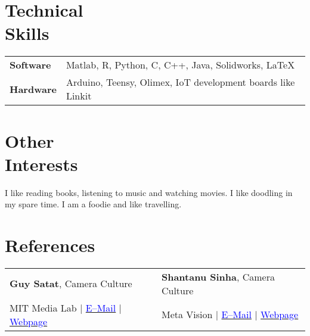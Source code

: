 \documentclass[margin,line]{res}
\begin{document}
\begin{resume}
\section{\sc Technical \\Skills} 
\begin{tabular}{@{}p{1.3in}p{4.3in}}
\textbf{Software} & Matlab, R, Python, C, C++, Java, Solidworks, \LaTeX \\  
\vspace*{-0.06in}
\textbf{Hardware} & 
\vspace*{-0.06in}
Arduino, Teensy, Olimex, IoT development boards like Linkit \\ 
\end{tabular}

\section{\sc Other \\Interests}
\lettrine[lines=2]{I}{} like reading books, listening to music and watching movies. I like doodling in my spare time. I am a foodie and like travelling. 

\section{\sc References}
\begin{tabular}{@{}p{3in}p{3in}}
\textbf{Guy Satat}, Camera Culture & \textbf{Shantanu Sinha}, Camera Culture \\ 
MIT Media Lab $|$ \href{mailto:guysatat@mit.edu}{\textcolor{blue}{E--Mail}} $|$ \href{http://web.media.mit.edu/~guysatat/}{\textcolor{blue}{Webpage}} & Meta Vision $|$ \href{mailto:s.sinha@metavision.com}{\textcolor{blue}{E--Mail}} $|$ \href{https://www.media.mit.edu/~sssinha}{\textcolor{blue}{Webpage}} \\
\end{tabular}
\vspace{-0.15in}


\end{resume}
\end{document}
